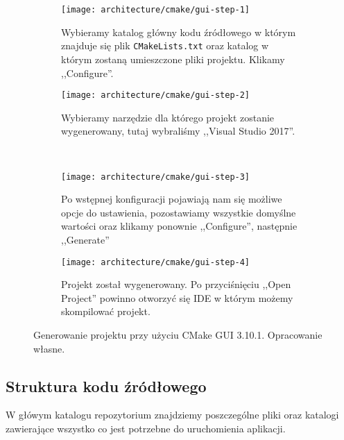 \documentclass[../main.tex]{subfiles}
\begin{document}
\begin{figure}
    \centering
    
    \begin{subfigure}[t]{0.40\textwidth}
        \texttt{[image: architecture/cmake/gui-step-1]}
        \caption{Wybieramy katalog główny kodu źródłowego w którym znajduje się plik \texttt{CMakeLists.txt} oraz katalog w którym zostaną umieszczone pliki projektu. Klikamy ,,Configure''.}
    \end{subfigure}
    \hspace{0.5cm}
    \begin{subfigure}[t]{0.40\textwidth}
        \centering
        \texttt{[image: architecture/cmake/gui-step-2]}
        \caption{Wybieramy narzędzie dla którego projekt zostanie wygenerowany, tutaj wybraliśmy ,,Visual Studio 2017''.}
    \end{subfigure}

    \hfill \\ 
    \vspace{0.5cm}

    \begin{subfigure}[t]{0.40\textwidth}
        \centering
        \texttt{[image: architecture/cmake/gui-step-3]}
        \caption{Po wstępnej konfiguracji pojawiają nam się możliwe opcje do ustawienia, pozostawiamy wszystkie domyślne wartości oraz klikamy ponownie ,,Configure'', następnie ,,Generate''}
    \end{subfigure}
    \hspace{0.5cm}
    \begin{subfigure}[t]{0.40\textwidth}
        \centering
        \texttt{[image: architecture/cmake/gui-step-4]}
        \caption{Projekt został wygenerowany. Po przyciśnięciu ,,Open Project'' powinno otworzyć się IDE w którym możemy skompilować projekt.}
    \end{subfigure}
    
    \caption{Generowanie projektu przy użyciu CMake GUI 3.10.1. Opracowanie własne.}
    \label{fig:CMakeGUIUsage}
\end{figure}


\subsection{Struktura kodu źródłowego}

W główym katalogu repozytorium znajdziemy poszczególne pliki oraz katalogi zawierające wszystko co jest potrzebne do uruchomienia aplikacji.
\end{document}

